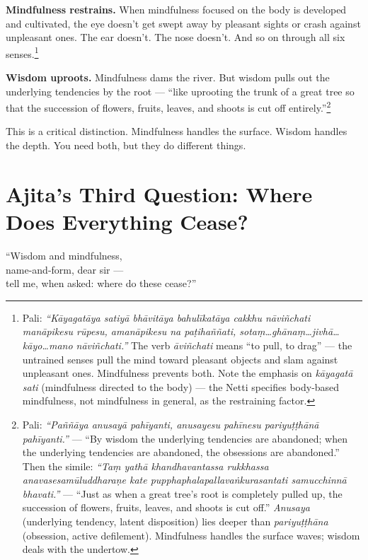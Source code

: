 \textbf{Mindfulness restrains.} When mindfulness focused on the body is developed and cultivated, the eye doesn't get swept away by pleasant sights or crash against unpleasant ones. The ear doesn't. The nose doesn't. And so on through all six senses.\footnote{Pali: \textit{``Kāyagatāya satiyā bhāvitāya bahulīkatāya cakkhu nāviñchati manāpikesu rūpesu, amanāpikesu na paṭihaññati, sotaṃ\ldots ghānaṃ\ldots jivhā\ldots kāyo\ldots mano nāviñchati.''} The verb \textit{āviñchati} means ``to pull, to drag'' --- the untrained senses pull the mind toward pleasant objects and slam against unpleasant ones. Mindfulness prevents both. Note the emphasis on \textit{kāyagatā sati} (mindfulness directed to the body) --- the Netti specifies body-based mindfulness, not mindfulness in general, as the restraining factor.}

\textbf{Wisdom uproots.} Mindfulness dams the river. But wisdom pulls out the underlying tendencies by the root --- ``like uprooting the trunk of a great tree so that the succession of flowers, fruits, leaves, and shoots is cut off entirely.''\footnote{Pali: \textit{``Paññāya anusayā pahīyanti, anusayesu pahīnesu pariyuṭṭhānā pahīyanti.''} --- ``By wisdom the underlying tendencies are abandoned; when the underlying tendencies are abandoned, the obsessions are abandoned.'' Then the simile: \textit{``Taṃ yathā khandhavantassa rukkhassa anavasesamūluddharaṇe kate pupphaphalapallavaṅkurasantati samucchinnā bhavati.''} --- ``Just as when a great tree's root is completely pulled up, the succession of flowers, fruits, leaves, and shoots is cut off.'' \textit{Anusaya} (underlying tendency, latent disposition) lies deeper than \textit{pariyuṭṭhāna} (obsession, active defilement). Mindfulness handles the surface waves; wisdom deals with the undertow.}

This is a critical distinction. Mindfulness handles the surface. Wisdom handles the depth. You need both, but they do different things.

\section*{Ajita's Third Question: Where Does Everything Cease?}

\begin{versebox}
``Wisdom and mindfulness,\\
name-and-form, dear sir ---\\
tell me, when asked: where do these cease?''
\end{versebox}


